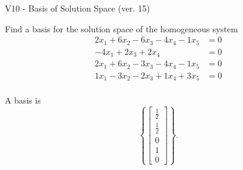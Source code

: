 \begin{exercise}
  \begin{exerciseTitle}V10 - Basis of Solution Space (ver. 15)\end{exerciseTitle}
  \begin{exerciseStatement}
    Find a basis for the solution space of the homogeneous system 
\begin{align*}
 2 x_ 1 + 6 x_ 2 -6 x_ 3 -4 x_ 4 -1 x_ 5 &= 0  \\ 
  -4 x_ 1 + 2 x_ 3 + 2 x_ 4 &= 0  \\ 
  2 x_ 1 + 6 x_ 2 -3 x_ 3 -4 x_ 4 -1 x_ 5 &= 0  \\ 
  1 x_ 1 -3 x_ 2 -2 x_ 3 + 1 x_ 4 + 3 x_ 5 &= 0  \\ 
 \end{align*}


 
  \end{exerciseStatement}

  \begin{exerciseAnswer}
   A basis is   
\[\left\{\left[\begin{array}{c}
\frac{1}{2} \\
\frac{1}{2} \\
0 \\
1 \\
0
\end{array}\right]\right\}.\]

  


  \end{exerciseAnswer}
\end{exercise}